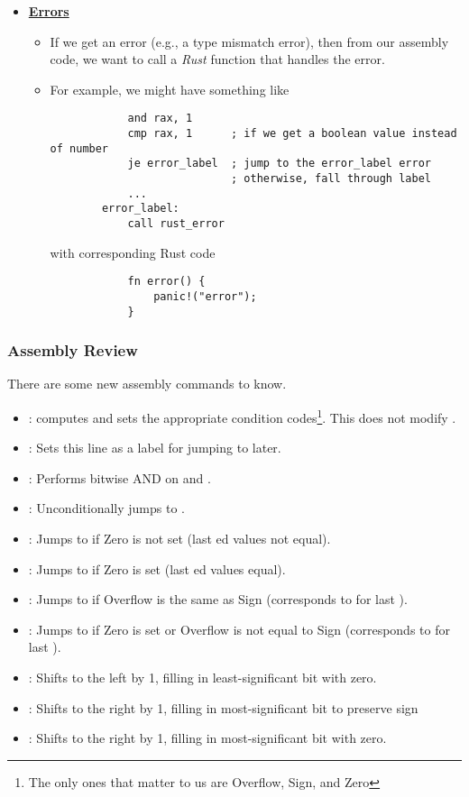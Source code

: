 \documentclass[letterpaper]{article}
\begin{document}
\begin{itemize}
    \item \underline{\textbf{Errors}}
    \begin{itemize}
        \item If we get an error (e.g., a type mismatch error), then from our assembly code, we want to call a \emph{Rust} function that handles the error. 
        \item For example, we might have something like 
        \begin{verbatim}
            and rax, 1 
            cmp rax, 1      ; if we get a boolean value instead of number
            je error_label  ; jump to the error_label error 
                            ; otherwise, fall through label
            ...
        error_label: 
            call rust_error\end{verbatim}
        with corresponding Rust code 
        \begin{verbatim}
            fn error() {
                panic!("error");
            }\end{verbatim}
    \end{itemize}
\end{itemize}


\subsubsection{Assembly Review}
There are some new assembly commands to know.
\begin{itemize}
    \item {}: computes  and sets the appropriate condition codes\footnote{The only ones that matter to us are Overflow, Sign, and Zero}. This does not modify .
    \item {}: Sets this line as a label for jumping to later. 
    \item {}: Performs bitwise AND on  and . 
    \item {}: Unconditionally jumps to .
    \item {}: Jumps to  if Zero is not set (last ed values not equal).
    \item {}: Jumps to  if Zero is set (last ed values equal).
    \item {}: Jumps to  if Overflow is the same as Sign (corresponds to \code{>=} for last ).
    \item {}: Jumps to  if Zero is set or Overflow is not equal to Sign (corresponds to \code{<=} for last ).
    \item {}: Shifts  to the left by 1, filling in least-significant bit with zero.
    \item {}: Shifts  to the right by 1, filling in most-significant bit to preserve sign
    \item {}: Shifts  to the right by 1, filling in most-significant bit with zero.
\end{itemize}
\end{document}
